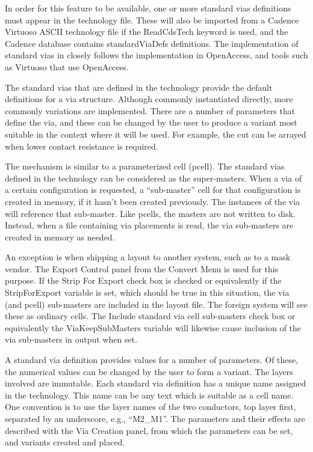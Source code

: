 In order for this feature to be available, one or more standard vias
definitions must appear in the technology file.  These will also be
imported from a Cadence Virtuoso ASCII technology file if the {\vt
ReadCdsTech} keyword is used, and the Cadence database contains {\vt
standardViaDefs} definitions.  The implementation of standard vias in
{\Xic} closely follows the implementation in OpenAccess, and tools
such as Virtuoso that use OpenAccess.

The standard vias that are defined in the technology provide the
default definitions for a via structure.  Although commonly
instantiated directly, more commonly variations are implemented. 
There are a number of parameters that define the via, and these can be
changed by the user to produce a variant most suitable in the context
where it will be used.  For example, the cut can be arrayed when lower
contact resistance is required.

The mechanism is similar to a parameterized cell (pcell).  The
standard vias defined in the technology can be considered as the
super-masters.  When a via of a certain configuration is requested, a
``sub-master'' cell for that configuration is created in memory, if it
hasn't been created previously.  The instances of the via will
reference that sub-master.  Like pcells, the masters are not written
to disk.  Instead, when a file containing via placements is read, the
via sub-masters are created in memory as needed.

An exception is when shipping a layout to another system, such as to a
mask vendor.  The {\cb Export Control} panel from the {\cb Convert
Menu} is used for this purpose.  If the {\cb Strip For Export} check
box is checked or equivalently if the {\et StripForExport} variable is
set, which should be true in this situation, the via (and pcell)
sub-masters are included in the layout file.  The foreign system will
see these as ordinary cells.  The {\cb Include standard via cell
sub-masters} check box or equivalently the {\et ViaKeepSubMasters}
variable will likewise cause inclusion of the via sub-masters in
output when set.

A standard via definition provides values for a number of parameters. 
Of these, the numerical values can be changed by the user to form a
variant.  The layers involved are immutable.  Each standard via
definition has a unique name assigned in the technology.  This name
can be any text which is suitable as a cell name.  One convention is
to use the layer names of the two conductors, top layer first,
separated by an underscore, e.g., ``{\vt M2\_M1}''.  The parameters
and their effects are described with the {\cb Via Creation} panel,
from which the parameters can be set, and variants created and placed.

